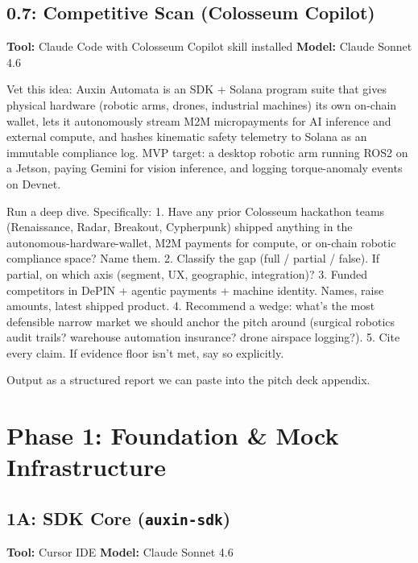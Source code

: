 \documentclass[11pt, a4paper]{article}
\begin{document}
\subsection*{0.7: Competitive Scan (Colosseum Copilot)}
\textbf{Tool:} Claude Code with Colosseum Copilot skill installed \quad \textbf{Model:} Claude Sonnet 4.6

\begin{promptbox}
Vet this idea: Auxin Automata is an SDK + Solana program suite that gives physical hardware (robotic arms, drones, industrial machines) its own on-chain wallet, lets it autonomously stream M2M micropayments for AI inference and external compute, and hashes kinematic safety telemetry to Solana as an immutable compliance log. MVP target: a desktop robotic arm running ROS2 on a Jetson, paying Gemini for vision inference, and logging torque-anomaly events on Devnet.

Run a deep dive. Specifically:
1. Have any prior Colosseum hackathon teams (Renaissance, Radar, Breakout, Cypherpunk) shipped anything in the autonomous-hardware-wallet, M2M payments for compute, or on-chain robotic compliance space? Name them.
2. Classify the gap (full / partial / false). If partial, on which axis (segment, UX, geographic, integration)?
3. Funded competitors in DePIN + agentic payments + machine identity. Names, raise amounts, latest shipped product.
4. Recommend a wedge: what's the most defensible narrow market we should anchor the pitch around (surgical robotics audit trails? warehouse automation insurance? drone airspace logging?).
5. Cite every claim. If evidence floor isn't met, say so explicitly.

Output as a structured report we can paste into the pitch deck appendix.
\end{promptbox}

\section{Phase 1: Foundation \& Mock Infrastructure}

\subsection*{1A: SDK Core (\texttt{auxin-sdk})}
\textbf{Tool:} Cursor IDE \quad \textbf{Model:} Claude Sonnet 4.6
\end{document}
